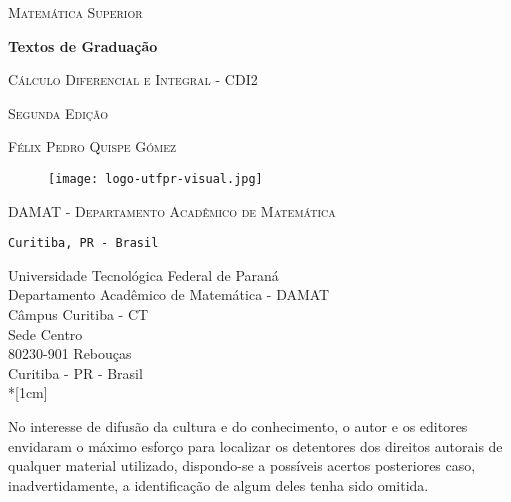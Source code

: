 %
\begin{titlepage}
	\centering
	
	\vspace*{1cm}
	{\Huge\scshape Matemática Superior  \par}
	\textbf{Textos de Graduação}
	
	\vspace{1.5cm}
	\LARGE
	{\scshape Cálculo Diferencial e Integral - CDI2\par}

	\vspace{0.5cm}
	{\scshape\Large Segunda Edição \par}

\vspace{1.5cm}
	{\scshape\large Félix Pedro Quispe Gómez \par}

	\vspace{3.0cm}
	\begin{figure}[H]
		\centering
		\texttt{[image: logo-utfpr-visual.jpg]}
	\end{figure}
	
	\vfill
	{\scshape\Large DAMAT - Departamento Acadêmico de Matemática  \par}
	
	\texttt{Curitiba, PR - Brasil}
\end{titlepage}
\newpage
%
\thispagestyle{empty}
\begin{minipage}{4.5in}
	\renewcommand{\baselinestretch}{1.0}
	\footnotesize
	Universidade Tecnológica Federal de Paraná\\
	Departamento Acadêmico de Matemática - DAMAT\\
	Câmpus Curitiba - CT\\
	Sede Centro\\
	80230-901 \;  Rebouças\\
	Curitiba - PR - Brasil\\*[1cm]
\end{minipage}

\vspace*{2.0cm}
\begin{minipage}{4.5in}
	\renewcommand{\baselinestretch}{1.0}
	\footnotesize
	No interesse de difusão da cultura e do conhecimento, o autor e os editores envidaram o máximo esforço 
	para localizar os detentores dos direitos autorais de qualquer material utilizado, dispondo-se a 
	possíveis acertos posteriores caso, inadvertidamente, a identificação de algum deles tenha sido omitida.
\end{minipage}

